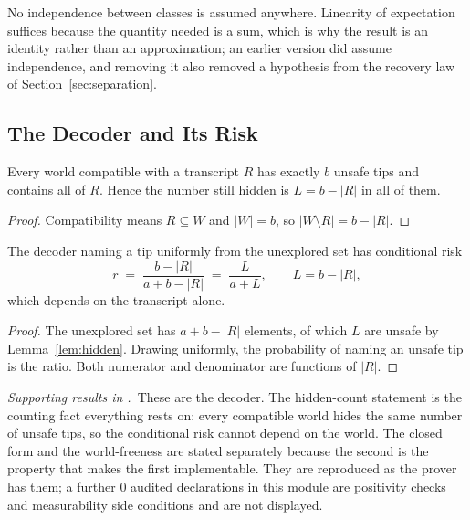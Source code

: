 No independence between classes is assumed anywhere. Linearity of expectation suffices because
the quantity needed is a sum, which is why the result is an identity rather than an
approximation; an earlier version did assume independence, and removing it also removed a
hypothesis from the recovery law of Section~\ref{sec:separation}.

\subsection{The Decoder and Its Risk}
\label{sec:decoder}

\begin{lemma}
\label{lem:hidden}
Every world compatible with a transcript $R$ has exactly $b$ unsafe tips and contains all of
$R$. Hence the number still hidden is $L=b-|R|$ in all of them.
\end{lemma}

\begin{proof}
Compatibility means $R\subseteq W$ and $|W|=b$, so $|W\setminus R|=b-|R|$.
\end{proof}


\begin{theorem}
\label{thm:equivariant}
The decoder naming a tip uniformly from the unexplored set has conditional risk
\begin{equation}
r\;=\;\frac{b-|R|}{a+b-|R|}\;=\;\frac{L}{a+L},
\qquad L=b-|R|,
\label{eq:decoder}
\end{equation}
which depends on the transcript alone.
\end{theorem}

\begin{proof}
The unexplored set has $a+b-|R|$ elements, of which $L$ are unsafe by
Lemma~\ref{lem:hidden}. Drawing uniformly, the probability of naming an unsafe tip is the
ratio. Both numerator and denominator are functions of $|R|$.
\end{proof}


\noindent\emph{Supporting results in .}~These are the decoder. The hidden-count statement is the counting fact everything rests on: every compatible world hides the same number of unsafe tips, so the conditional risk cannot depend on the world. The closed form and the world-freeness are stated separately because the second is the property that makes the first implementable. They are reproduced as the prover has them; a further $0$ audited declarations in this module are positivity checks and measurability side conditions and are not displayed.

